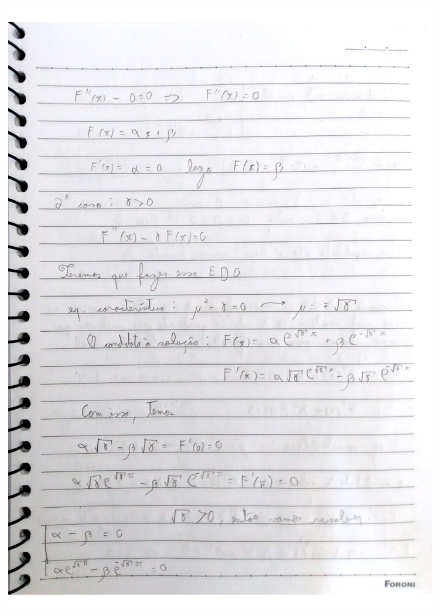 \documentclass[a4paper]{article}
\begin{document}
        \begin{figure}{\textwidth}
            \centering
            \includegraphics[width=\textwidth]{Questoes-1-3_page-0003.jpg}
        \end{figure}
\end{document}
